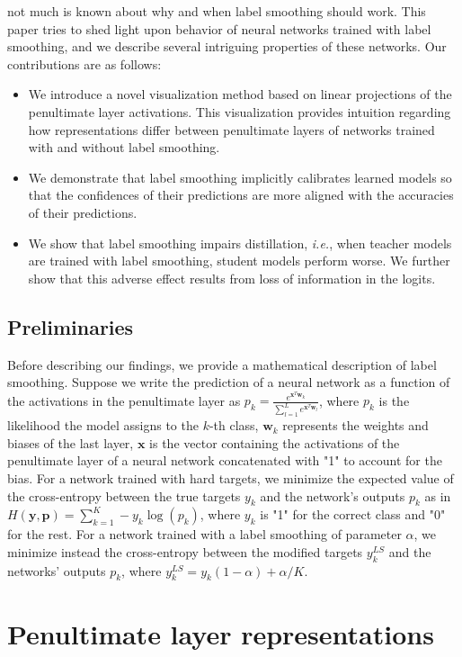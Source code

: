 \documentclass{article}
\begin{document}
not much is known about why and when label smoothing should work. This paper tries to shed light upon behavior of neural networks trained with label smoothing, and we describe several intriguing properties of these networks.
Our contributions are as follows:
\begin{itemize}
    \item We introduce a novel visualization method based on linear projections of the penultimate layer activations. This visualization provides intuition regarding how representations differ between penultimate layers of networks trained with and without label smoothing.
    \item We demonstrate that label smoothing implicitly calibrates learned models so that the confidences of their predictions are more aligned with the accuracies of their predictions.
    \item We show that label smoothing impairs distillation, \textit{i.e.}, when teacher models are trained with label smoothing, student models perform worse. We further show that this adverse effect results from loss of information in the logits.
\end{itemize}

\subsection{Preliminaries}
Before describing our findings, we provide a mathematical description of label smoothing. Suppose we write the prediction of a neural network as a function of the activations in the penultimate layer as $p_k = \frac{e^{\bm{x}^T\bm{w}_k}}{\sum_{l=1}^{L}e^{\bm{x}^T\bm{w}_l}}$, where $p_k$ is the
likelihood the model assigns to the $k$-th class,
$\bm{w}_k$ represents the weights and biases of the last layer, $\bm{x}$ is the vector containing the activations of the penultimate layer of a neural network concatenated with "1" to account for the bias. For a network trained with hard targets, we minimize the expected value of the cross-entropy between the true targets $y_k$ and the network's outputs $p_k$ as in $H(\bm{y},\bm{p}) = \sum_{k=1}^{K}-y_k\log(p_k)$, where $y_k$ is "1" for the correct class and "0" for the rest. For a network trained with a label smoothing of parameter $\alpha$, we minimize instead the cross-entropy between the modified targets $y^{LS}_k$ and the networks' outputs $p_k$, where $y^{LS}_k = y_k(1-\alpha) + \alpha/K$.

\section{Penultimate layer representations}
\label{sec:vis}
\end{document}
